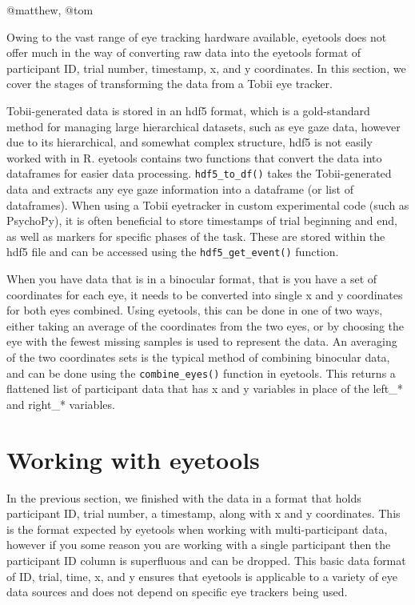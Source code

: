 \documentclass[
  man,
  floatsintext,
  longtable,
  nolmodern,
  notxfonts,
  notimes,
  colorlinks=true,linkcolor=blue,citecolor=blue,urlcolor=blue]{apa7}
\begin{document}
@matthew, @tom

Owing to the vast range of eye tracking hardware available, eyetools
does not offer much in the way of converting raw data into the eyetools
format of participant ID, trial number, timestamp, x, and y coordinates.
In this section, we cover the stages of transforming the data from a
Tobii eye tracker.

Tobii-generated data is stored in an hdf5 format, which is a
gold-standard method for managing large hierarchical datasets, such as
eye gaze data, however due to its hierarchical, and somewhat complex
structure, hdf5 is not easily worked with in R. eyetools contains two
functions that convert the data into dataframes for easier data
processing. \texttt{hdf5\_to\_df()} takes the Tobii-generated data and
extracts any eye gaze information into a dataframe (or list of
dataframes). When using a Tobii eyetracker in custom experimental code
(such as PsychoPy), it is often beneficial to store timestamps of trial
beginning and end, as well as markers for specific phases of the task.
These are stored within the hdf5 file and can be accessed using the
\texttt{hdf5\_get\_event()} function.

When you have data that is in a binocular format, that is you have a set
of coordinates for each eye, it needs to be converted into single x and
y coordinates for both eyes combined. Using eyetools, this can be done
in one of two ways, either taking an average of the coordinates from the
two eyes, or by choosing the eye with the fewest missing samples is used
to represent the data. An averaging of the two coordinates sets is the
typical method of combining binocular data, and can be done using the
\texttt{combine\_eyes()} function in eyetools. This returns a flattened
list of participant data that has x and y variables in place of the
left\_* and right\_* variables.

\section{Working with eyetools}\label{working-with-eyetools}

In the previous section, we finished with the data in a format that
holds participant ID, trial number, a timestamp, along with x and y
coordinates. This is the format expected by eyetools when working with
multi-participant data, however if you some reason you are working with
a single participant then the participant ID column is superfluous and
can be dropped. This basic data format of ID, trial, time, x, and y
ensures that eyetools is applicable to a variety of eye data sources and
does not depend on specific eye trackers being used.
\end{document}
